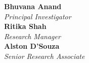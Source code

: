 \documentclass[a4paper, 12pt]{article}
\begin{document}
\setlength{\columnsep}{0.4pt}

\begin{multicols}{3}

\textbf{Bhuvana Anand} \\ \textit{Principal Investigator}\\

\textbf{Ritika Shah} \\ \textit{Research Manager} \\

\textbf{Alston D’Souza} \\ \textit{Senior Research Associate} \\

\end{multicols}






                  
                                                 
\end{document}
